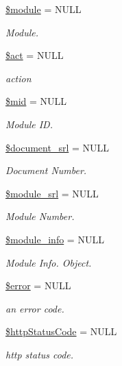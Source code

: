 \begin{DoxyCompactItemize}
\item 
\hyperlink{classModuleHandler_a24f28ac6c101582f043bef672a9f3b00}{\$module} = N\-U\-L\-L
\begin{DoxyCompactList}\small\item\em Module. \end{DoxyCompactList}\item 
\hyperlink{classModuleHandler_ae332c92a6ad1e9e823281d708088a0ff}{\$act} = N\-U\-L\-L
\begin{DoxyCompactList}\small\item\em action \end{DoxyCompactList}\item 
\hyperlink{classModuleHandler_a6bb7e9e29c0fb9893d051179281b093e}{\$mid} = N\-U\-L\-L
\begin{DoxyCompactList}\small\item\em Module I\-D. \end{DoxyCompactList}\item 
\hyperlink{classModuleHandler_acf9f6062042025aab6a7e10f6b261909}{\$document\-\_\-srl} = N\-U\-L\-L
\begin{DoxyCompactList}\small\item\em Document Number. \end{DoxyCompactList}\item 
\hyperlink{classModuleHandler_ad79751537e64d7bfc7dc6fa4280043b0}{\$module\-\_\-srl} = N\-U\-L\-L
\begin{DoxyCompactList}\small\item\em Module Number. \end{DoxyCompactList}\item 
\hyperlink{classModuleHandler_a2388e5ef665a5a82efa00c8c894df33c}{\$module\-\_\-info} = N\-U\-L\-L
\begin{DoxyCompactList}\small\item\em Module Info. Object. \end{DoxyCompactList}\item 
\hyperlink{classModuleHandler_ad81b78f21e42724e73da6808c561159c}{\$error} = N\-U\-L\-L
\begin{DoxyCompactList}\small\item\em an error code. \end{DoxyCompactList}\item 
\hyperlink{classModuleHandler_a033e864206ca6a6494af015baa5d2365}{\$http\-Status\-Code} = N\-U\-L\-L
\begin{DoxyCompactList}\small\item\em http status code. \end{DoxyCompactList}\end{DoxyCompactItemize}


